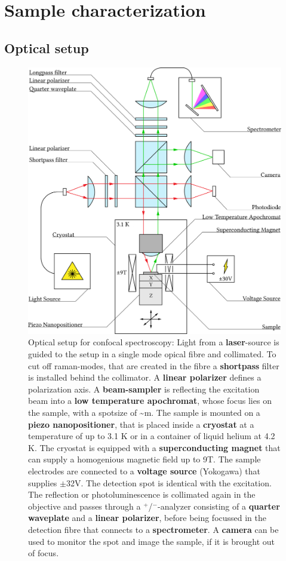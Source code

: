 \chapter{Sample characterization}

\section{Optical setup}

\begin{figure}
	\centering
	\includegraphics[width=.8\textwidth]{OptischerAufbau.png}
	\caption{Optical setup for confocal spectroscopy: Light from a \textbf{laser}-source is guided to the setup in a single mode opical fibre and collimated. To cut off raman-modes, that are created in the fibre a \textbf{shortpass} filter is installed behind the collimator. A \textbf{linear polarizer} defines a polarization axis. A \textbf{beam-sampler} is reflecting the excitation beam into a \textbf{low temperature apochromat}, whose focus lies on the sample, with a spotsize of \textasciitilde{}\mu m. The sample is mounted on a \textbf{piezo nanopositioner}, that is placed inside a \textbf{cryostat} at a temperature of up to 3.1 K or in a container of liquid helium at 4.2 K. The cryostat is equipped with a \textbf{superconducting magnet} that can supply a homogenious magnetic field up to 9T. The sample electrodes are connected to a \textbf{voltage source} (Yokogawa) that supplies {\small$\pm$}32V. The detection spot is identical with the excitation. The reflection or photoluminescence is collimated again in the objective and passes through a \sigma$^+$/\sigma$^-$-analyzer consisting of a \textbf{quarter waveplate} and a \textbf{linear polarizer}, before being focussed in the detection fibre that connects to a \textbf{spectrometer}. A \textbf{camera} can be used to monitor the spot and image the sample, if it is brought out of focus.}
	\label{opticalsetup}
\end{figure}

